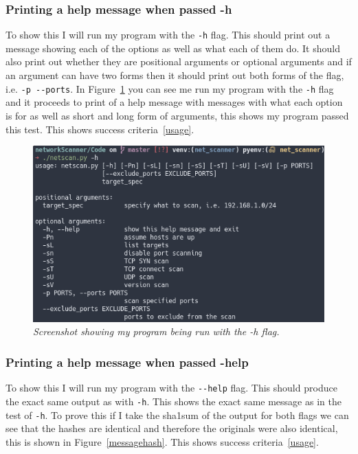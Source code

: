 \documentclass[titlepage]{article}
\let\Oldsubsubsection\subsubsection{}
\renewcommand{\subsubsection}{\FloatBarrier\Oldsubsubsection}
\begin{document}
\subsubsection{Printing a help message when passed -h}

To show this I will run my program with the \verb|-h| flag.
This should print out a message showing each of the options as well as what each of them do.
It should also print out whether they are positional arguments or optional arguments and if
an argument can have two forms then it should print out both forms of the flag, i.e. \verb|-p --ports|.
In Figure~\ref{hflagtest} you can see me run my program with the \verb|-h| flag and it proceeds to
print of a help message with messages with what each option is for as well as short and long form of
arguments, this shows my program passed this test.
This shows success criteria~\ref{usage}.

\begin{figure}[H]
  \centering
  \includegraphics[width=\textwidth]{hmessage.png}
  \caption{\textit{%
    Screenshot showing my program being run with the -h flag.
}}\label{hflagtest}
\end{figure}

\subsubsection{Printing a help message when passed -help}
To show this I will run my program with the \verb|--help| flag.
This should produce the exact same output as with \verb|-h|.
This shows the exact same message as in the test of \verb|-h|.
To prove this if I take the sha1sum of the output for both flags we can see
that the hashes are identical and therefore the originals were also identical,
this is shown in Figure~\ref{messagehash}.
This shows success criteria~\ref{usage}.
\end{document}
